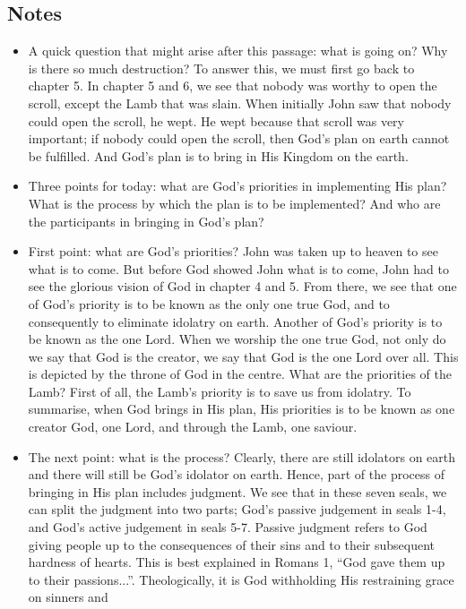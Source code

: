 \subsection*{Notes}
\begin{itemize}
  \item{A quick question that might arise after this passage: what is going
  on?  Why is there so much destruction?  To answer this, we must first go
  back to chapter 5.  In chapter 5 and 6, we see that nobody was worthy to
  open the scroll, except the Lamb that was slain.  When initially John saw
  that nobody could open the scroll, he wept.  He wept because that scroll
  was very important; if nobody could open the scroll, then God's plan on
  earth cannot be fulfilled.  And God's plan is to bring in His Kingdom on
  the earth.  }
  \item{Three points for today: what are God's priorities in implementing His
  plan?  What is the process by which the plan is to be implemented?  And who
  are the participants in bringing in God's plan?}
  \item{First point: what are God's priorities?  John was taken up to heaven
  to see what is to come.  But before God showed John what is to come, John
  had to see the glorious vision of God in chapter 4 and 5.  From there, we
  see that one of God's priority is to be known as the only one true God, and
  to consequently to eliminate idolatry on earth.  Another of God's priority
  is to be known as the one Lord.  When we worship the one true God, not only
  do we say that God is the creator, we say that God is the one Lord over
  all.  This is depicted by the throne of God in the centre.  What are the
  priorities of the Lamb?  First of all, the Lamb's priority is to save us
  from idolatry.  To summarise, when God brings in His plan, His priorities
  is to be known as one creator God, one Lord, and through the Lamb, one
  saviour.}
  \item{The next point: what is the process?  Clearly, there are still
  idolators on earth and there will still be God's idolator on earth.  Hence,
  part of the process of bringing in His plan includes judgment.  We see that
  in these seven seals, we can split the judgment into two parts; God's
  passive judgement in seals 1-4, and God's active judgement in seals 5-7.
  Passive judgment refers to God giving people up to the consequences of
  their sins and to their subsequent hardness of hearts.  This is best
  explained in Romans 1, ``God gave them up to their passions...''.
  Theologically, it is God withholding His restraining grace on sinners and
}
\end{itemize}
